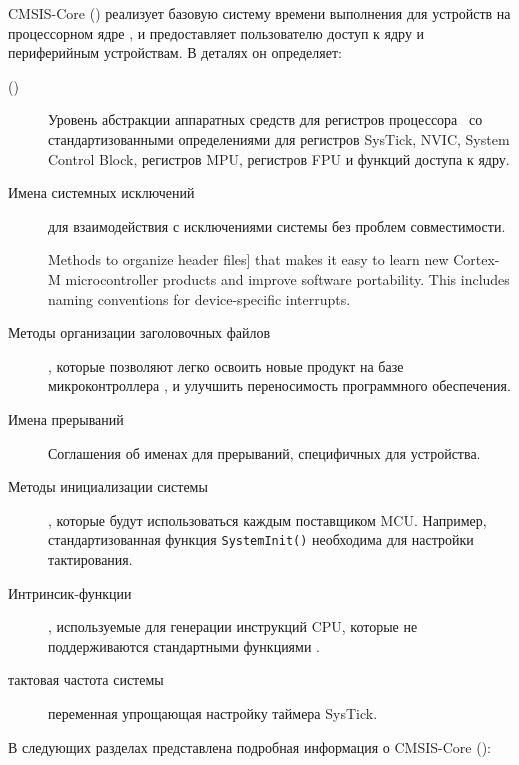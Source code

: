 \pagebreak
{}

CMSIS-Core (\cm{}) реализует базовую систему времени выполнения для устройств на
процессорном ядре \cm{}, и предоставляет пользователю доступ к ядру и
периферийным устройствам. В деталях он определяет:

\begin{description}

\item[ ()] Уровень абстракции
аппаратных средств для регистров процессора \cm{}\ со стандартизованными
определениями для регистров SysTick, NVIC, System Control Block, регистров MPU,
регистров FPU и функций доступа к ядру.

\item[Имена системных исключений] для взаимодействия с исключениями системы без
проблем совместимости.

Methods to organize header files] that makes it easy to learn new Cortex-M
microcontroller products and improve software portability. This includes naming
conventions for device-specific interrupts.

\item[Методы организации заголовочных файлов], которые позволяют легко освоить
новые продукт на базе микроконтроллера \cm{}, и улучшить переносимость
программного обеспечения.

\item[Имена прерываний] Соглашения об именах для прерываний,
специфичных для устройства.

\item[Методы инициализации системы], которые будут использоваться каждым
поставщиком MCU. Например, стандартизованная функция \verb|SystemInit()|
необходима для настройки тактирования.

\item[Интринсик-функции], используемые для генерации инструкций CPU, которые не
поддерживаются стан\-дарт\-ны\-ми функциями \purec.

\item[тактовая частота системы] переменная упрощающая настройку таймера
SysTick.

\end{description}

\pg
В следующих разделах представлена подробная информация о CMSIS-Core (\cm{}):

